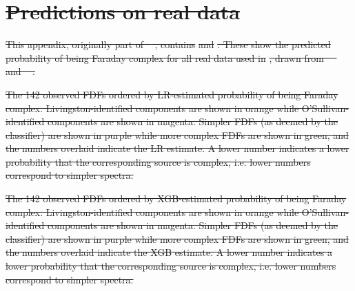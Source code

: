 \documentclass[11pt, a4paper]{book}
\providecommand{\DIFdeltex}[1]{{\protect\color{red}\sout{#1}}}                      %
\providecommand{\DIFdelFL}[1]{\DIFdel{#1}} %
\providecommand{\DIFdel}[1]{\texorpdfstring{\DIFdeltex{#1}}{}} %
\begin{document}
\section{\DIFdel{Predictions on real data}}
\addtocounter{section}{-1}%

\DIFdel{This appendix, originally part of \mbox{%
\citet{alger2021interpretable}}\hspace{0pt}%
, contains }%
\DIFdel{and }%
\DIFdel{. These show the predicted probability of being Faraday complex for all real data used in }%
\DIFdel{, drawn from \mbox{%
\citet{livingston21faraday} }\hspace{0pt}%
and \mbox{%
\citet{osullivan_broad-band_2017}}\hspace{0pt}%
.
}%

{%
\DIFdelFL{The 142 observed FDFs ordered by LR-estimated probability of being Faraday complex. Livingston-identified components are shown in orange while O'Sullivan-identified components are shown in magenta. Simpler FDFs (as deemed by the classifier) are shown in purple while more complex FDFs are shown in green, and the numbers overlaid indicate the LR estimate. A lower number indicates a lower probability that the corresponding source is complex, i.e. lower numbers correspond to simpler spectra.}}

{%
\DIFdelFL{The 142 observed FDFs ordered by XGB-estimated probability of being Faraday complex. Livingston-identified components are shown in orange while O'Sullivan-identified components are shown in magenta. Simpler FDFs (as deemed by the classifier) are shown in purple while more complex FDFs are shown in green, and the numbers overlaid indicate the XGB estimate. A lower number indicates a lower probability that the corresponding source is complex, i.e. lower numbers correspond to simpler spectra.}}
\end{document}
